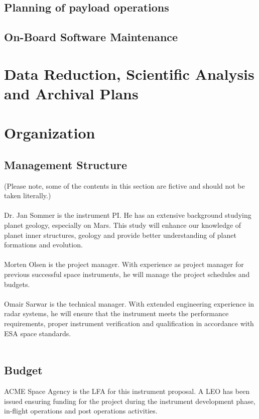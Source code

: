 \subsection{Planning of payload operations}
\subsection{On-Board Software Maintenance}
%
\section{Data Reduction, Scientific Analysis and Archival Plans}
%
\section{Organization}
\subsection{Management Structure}
(Please note, some of the contents in this section are fictive and should not be taken literally.)\\\\
%
\noindent
Dr. Jan Sommer is the instrument \ac{PI}. He has an extensive background studying planet geology, especially on Mars. This study will enhance our knowledge of planet inner structures, geology and provide better understanding of planet formations and evolution.\\\\
%
\noindent
Morten Olsen is the project manager. With experience as project manager for previous successful space instruments, he will manage the project schedules and budgets.\\\\
%
\noindent
Omair Sarwar is the technical manager. With extended engineering experience in radar systems, he will ensure that the instrument meets the performance requirements, proper instrument verification and qualification in accordance with ESA space standards.\\\\
%
\subsection{Budget}
ACME Space Agency is the \ac{LFA} for this instrument proposal. A \ac{LEO} has been issued ensuring funding for the project during the instrument development phase, in-flight operations and post operations activities.